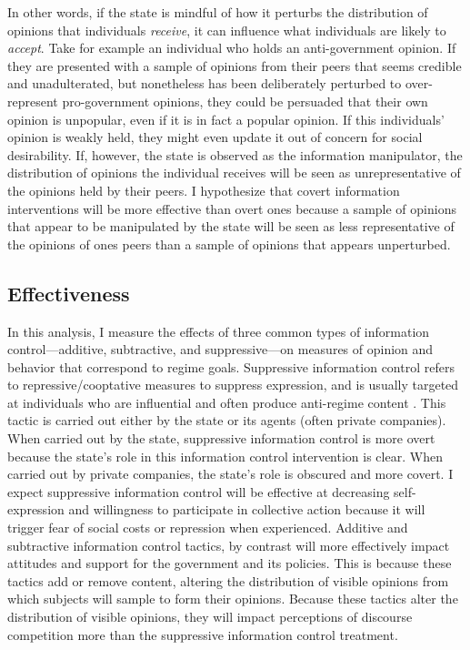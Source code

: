 \documentclass[11pt]{article}
\begin{document}
In other words, if the state is mindful of how it perturbs the distribution of opinions that individuals {\it receive}, it can influence what individuals are likely to {\it accept}. Take for example an individual who holds an anti-government opinion. If they are presented with a sample of opinions from their peers that seems credible and unadulterated, but nonetheless has been deliberately perturbed to over-represent pro-government opinions, they could be persuaded that their own opinion is unpopular, even if it is in fact a popular opinion. If this individuals' opinion is weakly held, they might even update it out of concern for social desirability. If, however, the state is observed as the information manipulator, the distribution of opinions the individual receives will be seen as unrepresentative of the opinions held by their peers. I hypothesize that covert information interventions will be more effective than overt ones because a sample of opinions that appear to be manipulated by the state will be seen as less representative of the opinions of ones peers than a sample of opinions that appears unperturbed.

\subsection{Effectiveness}

In this analysis, I measure the effects of three common types of information control---additive, subtractive, and suppressive---on measures of opinion and behavior that correspond to regime goals. Suppressive information control refers to repressive/cooptative measures to suppress expression, and is usually targeted at individuals who are influential and often produce anti-regime content \citep{gallagher2019who,roberts2018censored}. This tactic is carried out either by the state or its agents (often private companies). When carried out by the state, suppressive information control is more overt because the state's role in this information control intervention is clear. When carried out by private companies, the state's role is obscured and more covert. I expect suppressive information control will be effective at decreasing self-expression and willingness to participate in collective action because it will trigger fear of social costs or repression when experienced. Additive and subtractive information control tactics, by contrast will more effectively impact attitudes and support for the government and its policies. This is because these tactics add or remove content, altering the distribution of visible opinions from which subjects will sample to form their opinions. Because these tactics alter the distribution of visible opinions, they will impact perceptions of discourse competition more than the suppressive information control treatment. 
\end{document}

